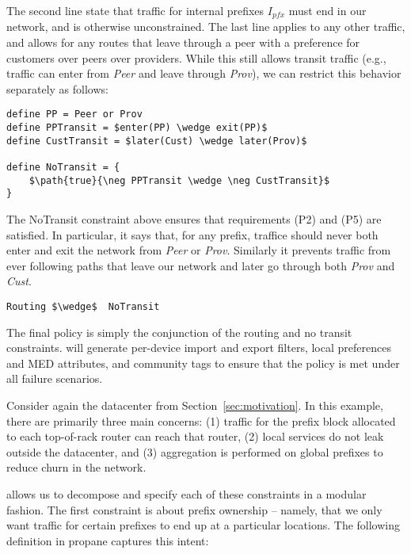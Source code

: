 The second line state that traffic for internal prefixes $I_{pfx}$ must end in our network, and is otherwise unconstrained. The last line applies to any other traffic, and allows for any routes that leave through a peer with a preference for customers over peers over providers. While this still allows transit traffic (e.g., traffic can enter from \textit{Peer} and leave through \textit{Prov}), we can restrict this behavior separately as follows:

\begin{lstlisting}[mathescape=true]
define PP = Peer or Prov
define PPTransit = $enter(PP) \wedge exit(PP)$
define CustTransit = $later(Cust) \wedge later(Prov)$

define NoTransit = {
    $\path{true}{\neg PPTransit \wedge \neg CustTransit}$
}
\end{lstlisting}

The \textsf{NoTransit} constraint above ensures that requirements (P2) and (P5) are satisfied. In particular, it says that, for any prefix, traffice should never both enter and exit the network from \textit{Peer} or \textit{Prov}. Similarly it prevents traffic from ever following paths that leave our network and later go through both \textit{Prov} and \textit{Cust}.

\begin{lstlisting}[mathescape=true]
Routing $\wedge$  NoTransit
\end{lstlisting}

The final policy is simply the conjunction of the routing and no transit constraints. \sysname will generate per-device import and export filters, local preferences and MED attributes, and community tags to ensure that the policy is met under all failure scenarios.



Consider again the datacenter from Section~\ref{sec:motivation}. In this example, there are primarily three main concerns: (1) traffic for the prefix block allocated to each top-of-rack router can reach that router, (2) local services do not leak outside the datacenter, and (3) aggregation is performed on global prefixes to reduce churn in the network. 

\sysname allows us to decompose and specify each of these constraints in a modular fashion. The first constraint is about prefix ownership -- namely, that we only want traffic for certain prefixes to end up at a particular locations. The following definition in propane captures this intent:

